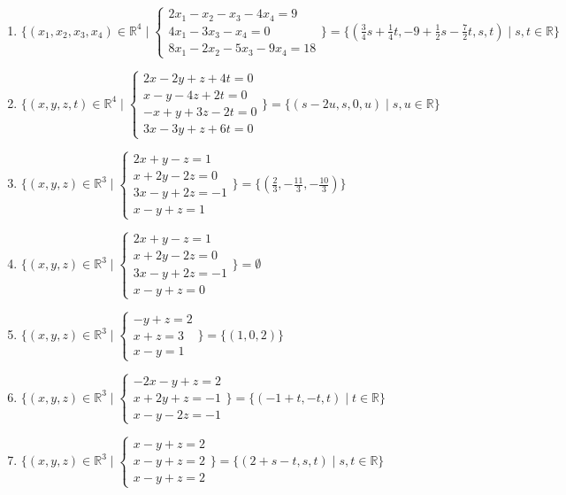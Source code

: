 \documentclass[11pt,a4paper]{article}
\begin{document}
\begin{enumerate}
\item $\displaystyle \{(x_{1}, x_{2}, x_{3}, x_{4}) \in \mathbb{R}^{4} \mid \begin{cases} 2x_{1} - x_{2} - x_{3} - 4x_{4} = 9 \\ 4x_{1} - 3x_{3} - x_{4} = 0 \\ 8x_{1} - 2x_{2} - 5x_{3} - 9x_{4} = 18 \end{cases}\} = \{(\frac{3}{4} s + \frac{1}{4} t, -9 + \frac{1}{2} s - \frac{7}{2} t, s, t) \mid s, t \in \mathbb{R}\}$
\item $\displaystyle \{(x, y, z, t) \in \mathbb{R}^{4} \mid \begin{cases} 2x - 2y + z + 4t = 0 \\ x - y - 4z + 2t = 0 \\ -x + y + 3z - 2t = 0 \\ 3x - 3y + z + 6t = 0 \end{cases}\} = \{(s - 2u, s, 0, u) \mid s, u \in \mathbb{R}\}$
\item $\displaystyle \{(x, y, z) \in \mathbb{R}^{3} \mid \begin{cases} 2x + y - z = 1 \\ x + 2y - 2z = 0 \\ 3x - y + 2z = -1 \\ x - y + z = 1 \end{cases}\} = \{(\frac{2}{3}, -\frac{11}{3}, -\frac{10}{3})\}$
\item $\displaystyle \{(x, y, z) \in \mathbb{R}^{3} \mid \begin{cases} 2x + y - z = 1 \\ x + 2y - 2z = 0 \\ 3x - y + 2z = -1 \\ x - y + z = 0 \end{cases}\} = \emptyset$
\item $\displaystyle \{(x, y, z) \in \mathbb{R}^{3} \mid \begin{cases} -y + z = 2 \\ x + z = 3 \\ x - y = 1 \end{cases}\} = \{(1, 0, 2)\}$
\item $\displaystyle \{(x, y, z) \in \mathbb{R}^{3} \mid \begin{cases} -2x - y + z = 2 \\ x + 2y + z = -1 \\ x - y - 2z = -1 \end{cases}\} = \{(-1 + t, -t, t) \mid t \in \mathbb{R}\}$
\item $\displaystyle \{(x, y, z) \in \mathbb{R}^{3} \mid \begin{cases} x - y + z = 2 \\ x - y + z = 2 \\ x - y + z = 2 \end{cases}\} = \{(2 + s - t, s, t) \mid s, t \in \mathbb{R}\}$

\end{enumerate}
\end{document}
